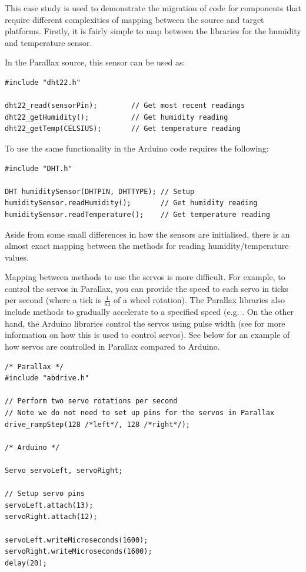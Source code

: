 \documentclass{UoYCSproject}
\begin{document}
This case study is used to demonstrate the migration of code for components that require different complexities of mapping between the source and target platforms. Firstly, it is fairly simple to map between the libraries for the humidity and temperature sensor. 

In the Parallax source, this sensor can be used as:
\begin{verbatim}
#include "dht22.h"

dht22_read(sensorPin);        // Get most recent readings
dht22_getHumidity();          // Get humidity reading
dht22_getTemp(CELSIUS);       // Get temperature reading
\end{verbatim}

To use the same functionality in the Arduino code requires the following:
\begin{verbatim}
#include "DHT.h"

DHT humiditySensor(DHTPIN, DHTTYPE); // Setup
humiditySensor.readHumidity();       // Get humidity reading
humiditySensor.readTemperature();    // Get temperature reading
\end{verbatim}

Aside from some small differences in how the sensors are initialised, there is an almost exact mapping between the methods for reading humidity/temperature values. 

Mapping between methods to use the servos is more difficult. For example, to control the servos in Parallax, you can provide the speed to each servo in ticks per second (where a tick is $\frac{1}{64}$ of a wheel rotation). The Parallax libraries also include methods to gradually accelerate to a specified speed (e.g. . On the other hand, the Arduino libraries control the servos using pulse width (see \parencite{pulse_width} for more information on how this is used to control servos). See below for an example of how servos are controlled in Parallax compared to Arduino.
\begin{verbatim}
/* Parallax */
#include "abdrive.h"

// Perform two servo rotations per second
// Note we do not need to set up pins for the servos in Parallax
drive_rampStep(128 /*left*/, 128 /*right*/); 

/* Arduino */

Servo servoLeft, servoRight;

// Setup servo pins
servoLeft.attach(13);
servoRight.attach(12);

servoLeft.writeMicroseconds(1600);
servoRight.writeMicroseconds(1600);
delay(20); 
\end{verbatim}
\end{document}
